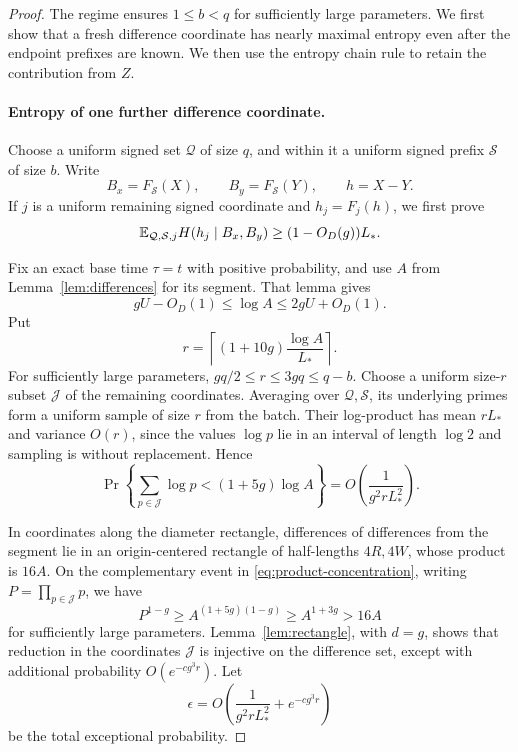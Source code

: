 \begin{proof}
The regime ensures \(1\le b<q\) for sufficiently large parameters.
We first show that a fresh difference coordinate has nearly maximal
entropy even after the endpoint prefixes are known. We then use the
entropy chain rule to retain the contribution from \(Z\).

\paragraph{Entropy of one further difference coordinate.}
Choose a uniform signed set \(\mathcal Q\) of size \(q\), and within it
a uniform signed prefix \(\mathcal S\) of size \(b\). Write
\[
 B_x=F_{\mathcal S}(X),\qquad B_y=F_{\mathcal S}(Y),\qquad h=X-Y.
\]
If \(j\) is a uniform remaining signed coordinate and
\(h_j=F_j(h)\), we first prove
\begin{equation}\label{eq:difference-coordinate}
 \mathbb E_{\mathcal Q,\mathcal S,j}H(h_j\mid B_x,B_y)
 \ge (1-O_D(g))L_*.
\end{equation}

Fix an exact base time \(\tau=t\) with positive probability, and use \(A\) from
Lemma~\ref{lem:differences} for its segment. That lemma gives
\[
 gU-O_D(1)\le\log A\le2gU+O_D(1).
\]
Put
\[
 r=\left\lceil(1+10g)\frac{\log A}{L_*}\right\rceil.
\]
For sufficiently large parameters,
\(gq/2\le r\le3gq\le q-b\).
Choose a uniform size-\(r\) subset \(\mathcal J\) of the remaining
coordinates. Averaging over \(\mathcal Q,\mathcal S\), its underlying
primes form a uniform sample of size \(r\) from the batch.
Their log-product has mean \(rL_*\) and variance \(O(r)\), since
the values \(\log p\) lie in an interval of length \(\log2\) and
sampling is without replacement. Hence
\begin{equation}\label{eq:product-concentration}
 \Pr\left\{\sum_{p\in\mathcal J}\log p
                 <(1+5g)\log A\right\}
 =O\left(\frac1{g^2rL_*^2}\right).
\end{equation}

In coordinates along the diameter rectangle, differences of
differences from the segment lie in an origin-centered rectangle
of half-lengths \(4R,4W\), whose product is \(16A\).
On the complementary event in \eqref{eq:product-concentration},
writing \(P=\prod_{p\in\mathcal J}p\), we have
\[
 P^{1-g}\ge A^{(1+5g)(1-g)}\ge A^{1+3g}>16A
\]
for sufficiently large parameters. Lemma~\ref{lem:rectangle},
with \(d=g\), shows that reduction in the coordinates
\(\mathcal J\) is injective on the difference set, except with
additional probability \(O(e^{-cg^3r})\).
Let
\[
 \epsilon=O\left(\frac1{g^2rL_*^2}+e^{-cg^3r}\right)
\]
be the total exceptional probability.


\end{proof}
